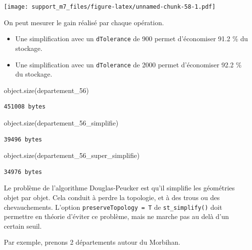 \documentclass[
]{book}
\newenvironment{Shaded}{\begin{snugshade}}{\end{snugshade}}
\newcommand{\FunctionTok}[1]{\textcolor[rgb]{0.00,0.00,0.00}{#1}}
\newcommand{\NormalTok}[1]{#1}
\begin{document}
\texttt{[image: support\_m7\_files/figure-latex/unnamed-chunk-58-1.pdf]}

On peut mesurer le gain réalisé par chaque opération.

\begin{itemize}
\item
  Une simplification avec un \texttt{dTolerance} de 900 permet d'économiser 91.2 \% du stockage.
\item
  Une simplification avec un \texttt{dTolerance} de 2000 permet d'économiser 92.2 \% du stockage.
\end{itemize}

\begin{Shaded}
\begin{Highlighting}[]
\FunctionTok{object.size}\NormalTok{(departement\_56)}
\end{Highlighting}
\end{Shaded}

\begin{verbatim}
451008 bytes
\end{verbatim}

\begin{Shaded}
\begin{Highlighting}[]
\FunctionTok{object.size}\NormalTok{(departement\_56\_simplifie)}
\end{Highlighting}
\end{Shaded}

\begin{verbatim}
39496 bytes
\end{verbatim}

\begin{Shaded}
\begin{Highlighting}[]
\FunctionTok{object.size}\NormalTok{(departement\_56\_super\_simplifie)}
\end{Highlighting}
\end{Shaded}

\begin{verbatim}
34976 bytes
\end{verbatim}

Le problème de l'algorithme Douglas-Peucker est qu'il simplifie les géométries objet par objet. Cela conduit à perdre la topologie, et à des trous ou des chevauchements. L'option \texttt{preserveTopology\ =\ T} de \texttt{st\_simplify()} doit permettre en théorie d'éviter ce problème, mais ne marche pas au delà d'un certain seuil.

Par exemple, prenons 2 départements autour du Morbihan.
\end{document}
